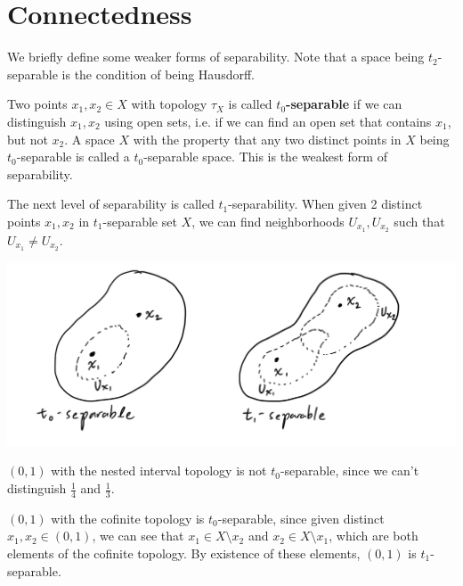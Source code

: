 \section{Connectedness} 

    We briefly define some weaker forms of separability. Note that a space being $t_2$-separable is the condition of being Hausdorff. 

    \begin{definition}[$t_0, t_1$-Separability]
    Two points $x_1, x_2 \in X$ with topology $\tau_{X}$ is called $t_0$\textbf{-separable} if we can distinguish $x_1, x_2$ using open sets, i.e. if we can find an open set that contains $x_1$, but not $x_2$. A space $X$ with the property that any two distinct points in $X$ being $t_0$-separable is called a $t_0$-separable space. This is the weakest form of separability. 

    The next level of separability is called $t_1$-separability. When given 2 distinct points $x_1, x_2$ in $t_1$-separable set $X$, we can find neighborhoods $U_{x_1}, U_{x_2}$ such that $U_{x_1} \neq U_{x_2}$. 
    \begin{center}
        \includegraphics[scale=0.25]{img/t0_t1_Separability.PNG}
    \end{center}
    \end{definition}

    \begin{example}
    $(0,1)$ with the nested interval topology is not $t_0$-separable, since we can't distinguish $\frac{1}{4}$ and $\frac{1}{3}$.
    \end{example}

    \begin{example}
    $(0,1)$ with the cofinite topology is $t_0$-separable, since given distinct $x_1, x_2 \in (0,1)$, we can see that $x_1 \in X \setminus {x_2}$ and $x_2 \in X \setminus {x_1}$, which are both elements of the cofinite topology. By existence of these elements, $(0,1)$ is $t_1$-separable. 
    \end{example}

